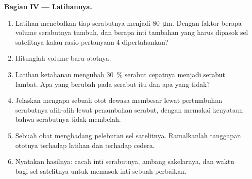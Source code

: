 \begin{problem}
\medskip
\noindent\textbf{Bagian IV --- Latihannya.}
\begin{enumerate}[resume]
  \item Latihan menebalkan tiap serabutnya menjadi \qty{80}{\micro m}.
        Dengan faktor berapa volume serabutnya tumbuh, dan berapa inti
        tambahan yang harus dipasok sel satelitnya kalau rasio
        pertanyaan 4 dipertahankan?
  \item Hitunglah volume baru ototnya.
  \item Latihan ketahanan mengubah \qty{30}{\%} serabut cepatnya menjadi
        serabut lambat. Apa yang berubah pada serabut itu dan apa yang
        tidak?
  \item Jelaskan mengapa sebuah otot dewasa membesar lewat pertumbuhan
        serabutnya alih-alih lewat penambahan serabut, dengan memakai
        kenyataan bahwa serabutnya tidak membelah.
  \item Sebuah obat menghadang peleburan sel satelitnya. Ramalkanlah
        tanggapan ototnya terhadap latihan dan terhadap cedera.
  \item Nyatakan hasilnya: cacah inti serabutnya, ambang sakelarnya,
        dan waktu bagi sel satelitnya untuk memasok inti sebuah
        perbaikan.
\end{enumerate}
\end{problem}
